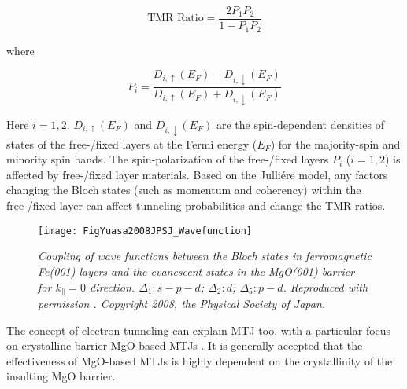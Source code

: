 \documentclass[molecules,review,submit,pdftex,moreauthors]{Definitions/mdpi}
\begin{document}
\begin{equation}
	\text{TMR Ratio} = \frac{2 P_1 P_2}{1 - P_1 P_2}
\end{equation}


\noindent where 

\begin{equation}
	P_i = \frac{D_{i, \uparrow} (E_F) - D_{i, \downarrow} (E_F)}{D_{i, \uparrow} (E_F) + D_{i, \downarrow} (E_F)}
\end{equation}


\noindent Here $i = 1, 2$.  $D_{i, \uparrow} (E_F)$ and $D_{i, \downarrow} (E_F)$ are the spin-dependent densities of states of the free-/fixed layers at the Fermi energy ($E_F$) for the majority-spin and minority spin bands.  The spin-polarization of the free-/fixed layers $P_i$ ($i = 1, 2$) is affected by free-/fixed layer materials.  Based on the Julli\'{e}re model, any factors changing the Bloch states (such as  momentum and coherency) within the free-/fixed layer can affect tunneling probabilities and  change the TMR ratios.


\begin{figure}
  \begin{center}
  	\texttt{[image: FigYuasa2008JPSJ\_Wavefunction]}
 \end{center}
  \caption{\textit{Coupling of wave functions between the Bloch states in ferromagnetic Fe(001) layers and the evanescent states in the MgO(001)  barrier for $k_{\parallel} = 0$ direction.  $\Delta_1: s-p-d$; $\Delta_2: d$; $\Delta_5: p-d$.  Reproduced with permission \cite{Yuasa2008JPSJ}.  Copyright 2008, the Physical Society of Japan.}}
  \label{Fig:Wavefunction}
\end{figure}


The concept of electron tunneling can explain MTJ too, with a particular focus on crystalline barrier MgO-based MTJs \cite{Butler2001PRB,Mathon2001PRB}.  It is generally accepted that the effectiveness of MgO-based MTJs is highly dependent on the crystallinity of the insulting MgO barrier.  
\end{document}
